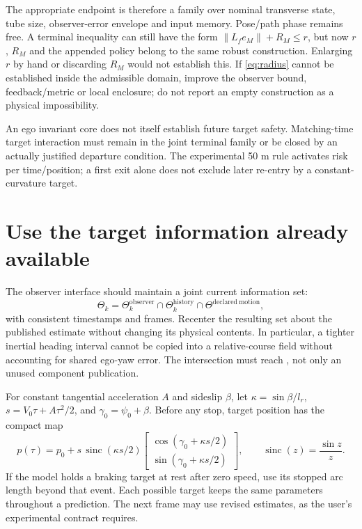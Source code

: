 \documentclass[11pt]{article}
\begin{document}
The appropriate endpoint is therefore a family over nominal transverse
state, tube size, observer-error envelope and input memory. Pose/path phase
remains free. A terminal inequality can still have the form
$\|L_fe_M\|+R_M\le r$, but now $r$, $R_M$ and the appended policy belong
to the same robust construction. Enlarging $r$ by hand or discarding $R_M$
would not establish this. If \eqref{eq:radius} cannot be established inside
the admissible domain, improve the observer bound, feedback/metric or local
enclosure; do not report an empty construction as a physical impossibility.

An ego invariant core does not itself establish future target safety.
Matching-time target interaction must remain in the joint terminal family
or be closed by an actually justified departure condition. The experimental
50 m rule activates risk per time/position; a first exit alone does not
exclude later re-entry by a constant-curvature target.

\section{Use the target information already available}
The observer interface should maintain a joint current information set:
\begin{equation}
 \Theta_k=\Theta_k^{\mathrm{observer}}
       \cap\Theta_k^{\mathrm{history}}
       \cap\Theta^{\mathrm{declared\ motion}},
\end{equation}
with consistent timestamps and frames. Recenter the resulting set about the
published estimate without changing its physical contents. In particular,
a tighter inertial heading interval cannot be copied into a relative-course
field without accounting for shared ego-yaw error. The intersection must
reach , not only an unused component publication.

For constant tangential acceleration $A$ and sideslip $\beta$, let
$\kappa=\sin\beta/l_r$, $s=V_0\tau+A\tau^2/2$, and
$\gamma_0=\psi_0+\beta$. Before any stop, target position has the compact map
\begin{equation}
 p(\tau)=p_0+s\,\operatorname{sinc}(\kappa s/2)
 \begin{bmatrix}\cos(\gamma_0+\kappa s/2)\\
                 \sin(\gamma_0+\kappa s/2)\end{bmatrix},
 \qquad\operatorname{sinc}(z)=\frac{\sin z}{z}.
\end{equation}
If the model holds a braking target at rest after zero speed, use its stopped
arc length beyond that event. Each possible target keeps the same parameters
throughout a prediction. The next frame may use revised estimates, as the
user's experimental contract requires.
\end{document}
